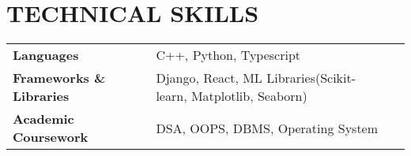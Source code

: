 \documentclass[12pt]{article}
\begin{document}
\section*{TECHNICAL SKILLS}
{\small
	\begin{tabular}{@{}llll}
		\textbf{Languages}               &   & C++, Python, Typescript                            \\
		\textbf{Frameworks \& Libraries} &   & Django, React, ML Libraries(Scikit-learn, Matplotlib, Seaborn) \\
		\textbf{Academic Coursework}     &   & DSA, OOPS, DBMS, Operating System                            \\
	\end{tabular}
}
\end{document}
